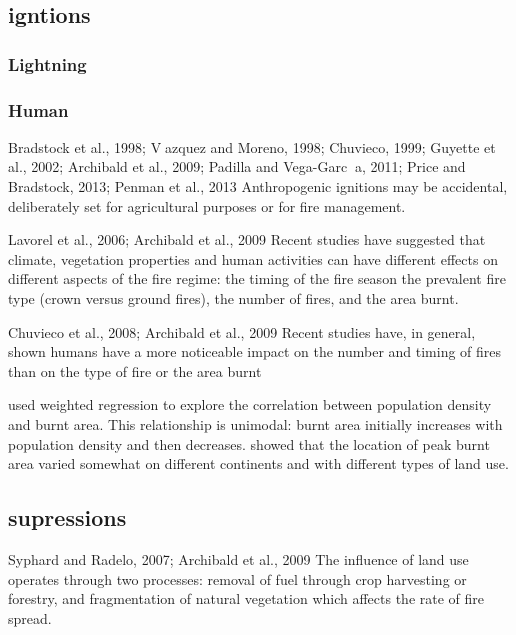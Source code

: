 \subsection{igntions}

\subsubsection{Lightning}

\subsubsection{Human}
Bradstock et al., 1998; Vazquez and
Moreno, 1998; Chuvieco, 1999; Guyette et al., 2002; Archibald et al., 2009; Padilla and
Vega-Garca, 2011; Price and Bradstock, 2013; Penman et al., 2013
Anthropogenic ignitions may be accidental, deliberately set
for agricultural purposes or for fire management.

Lavorel et al., 2006; Archibald et al., 2009
Recent studies have suggested that climate, vegetation properties and human activities can have different effects on different aspects of the fire regime:      the timing of the fire season
    the prevalent fire type (crown versus ground fires),
    the number of fires,
    and the area burnt.

Chuvieco et al., 2008; Archibald et al., 2009
Recent studies have, in general, shown humans have a more noticeable impact on the number and timing of fires than on the type of fire or the area burnt

\citet{bistinas2013relationships}
used weighted regression to explore the correlation between population density and burnt area. This relationship is unimodal: burnt area initially increases with population density and then decreases. \citet{bistinas2013relationships} showed that the location of peak burnt area varied somewhat on different continents and with different types of land use.

\subsection{supressions}
Syphard  and  Radelo,  2007;  Archibald  et  al.,  2009
The influence of land use operates through two processes:  removal of fuel through crop harvesting or forestry, and fragmentation of natural vegetation which affects the rate of fire spread.

